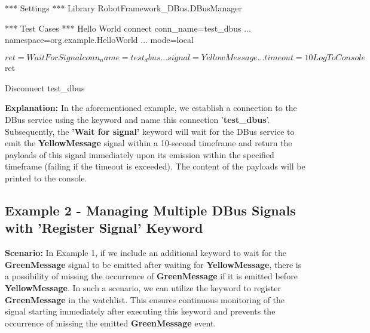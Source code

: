 \begin{robotcode}
*** Settings ***
Library    RobotFramework_DBus.DBusManager

*** Test Cases ***
Hello World
   connect    conn_name=test_dbus
   ...        namespace=org.example.HelloWorld
   ...        mode=local

   ${ret}=    Wait For Signal     conn_name=test_dbus
   ...                            signal=YellowMessage
   ...                            timeout=10

   Log To Console    ${ret}

   Disconnect    test_dbus
\end{robotcode}

\textbf{Explanation:}
In the aforementioned example, we establish a connection to the DBus service  using the  keyword and name this connection '\textbf{test\_dbus}'.
Subsequently, the \textbf{'Wait for signal'} keyword will wait for the DBus service to emit the \textbf{YellowMessage} signal within a 10-second timeframe and return the payloads of this signal
immediately upon its emission within the specified timeframe (failing if the timeout is exceeded). The content of the payloads will be printed to the console.

\hypertarget{description-example2}{%
\subsection{\texorpdfstring{\textbf{Example 2 - Managing Multiple DBus Signals with 'Register Signal' Keyword}}{Example 2 - Managing Multiple DBus Signals with 'Register Signal' Keyword}}\label{description-example2}}

\textbf{Scenario:}
In Example 1, if we include an additional  keyword to wait for the \textbf{GreenMessage} signal to be emitted after waiting for \textbf{YellowMessage},
there is a possibility of missing the occurrence of \textbf{GreenMessage} if it is emitted before \textbf{YellowMessage}. In such a scenario, we can utilize the 
keyword to register \textbf{GreenMessage} in the watchlist. This ensures continuous monitoring of the signal starting immediately after executing this keyword and prevents the occurrence
of missing the emitted \textbf{GreenMessage} event.


